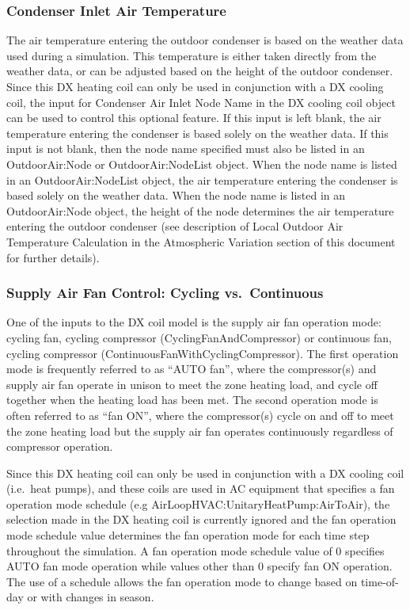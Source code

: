 \subsubsection{Condenser Inlet Air Temperature}\label{condenser-inlet-air-temperature-1}

The air temperature entering the outdoor condenser is based on the weather data used during a simulation. This temperature is either taken directly from the weather data, or can be adjusted based on the height of the outdoor condenser. Since this DX heating coil can only be used in conjunction with a DX cooling coil, the input for Condenser Air Inlet Node Name in the DX cooling coil object can be used to control this optional feature. If this input is left blank, the air temperature entering the condenser is based solely on the weather data. If this input is not blank, then the node name specified must also be listed in an OutdoorAir:Node or OutdoorAir:NodeList object. When the node name is listed in an OutdoorAir:NodeList object, the air temperature entering the condenser is based solely on the weather data. When the node name is listed in an OutdoorAir:Node object, the height of the node determines the air temperature entering the outdoor condenser (see description of Local Outdoor Air Temperature Calculation in the Atmospheric Variation section of this document for further details).

\subsubsection{Supply Air Fan Control: Cycling vs.~Continuous}\label{supply-air-fan-control-cycling-vs.continuous-1}

One of the inputs to the DX coil model is the supply air fan operation mode: cycling fan, cycling compressor (CyclingFanAndCompressor) or continuous fan, cycling compressor (ContinuousFanWithCyclingCompressor). The first operation mode is frequently referred to as ``AUTO fan'', where the compressor(s) and supply air fan operate in unison to meet the zone heating load, and cycle off together when the heating load has been met. The second operation mode is often referred to as ``fan ON'', where the compressor(s) cycle on and off to meet the zone heating load but the supply air fan operates continuously regardless of compressor operation.

Since this DX heating coil can only be used in conjunction with a DX cooling coil (i.e.~heat pumps), and these coils are used in AC equipment that specifies a fan operation mode schedule (e.g AirLoopHVAC:UnitaryHeatPump:AirToAir), the selection made in the DX heating coil is currently ignored and the fan operation mode schedule value determines the fan operation mode for each time step throughout the simulation. A fan operation mode schedule value of 0 specifies AUTO fan mode operation while values other than 0 specify fan ON operation. The use of a schedule allows the fan operation mode to change based on time-of-day or with changes in season.


